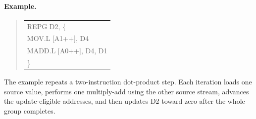 \paragraph{Example.}
\begin{quote}
\begingroup\small\ttfamily
\begin{tabular}{@{}l@{}}
REPG D2, \{\\
\quad MOV.L  [A1++], D4\\
\quad MADD.L [A0++], D4, D1\\
\}\\
\end{tabular}
\endgroup
\end{quote}

The example repeats a two-instruction dot-product step. Each iteration loads one
source value, performs one multiply-add using the other source stream, advances
the update-eligible addresses, and then updates D2 toward zero after the whole
group completes.
